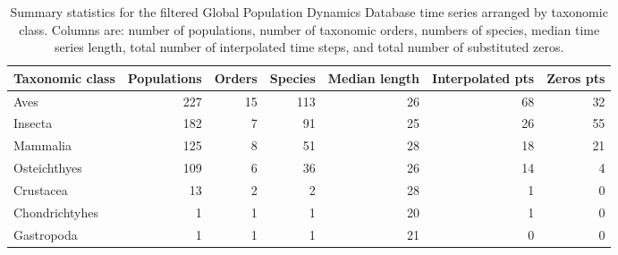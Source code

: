 \begin{table}[ht]
\centering
\caption{Summary statistics for the filtered Global Population Dynamics Database time series arranged by taxonomic class. Columns are: number of populations, number of taxonomic orders, numbers of species, median time series length, total number of interpolated time steps, and total number of substituted zeros.} 
\begin{tabular}{lrrrrrr}
  \toprule
Taxonomic class & Populations & Orders & Species & Median length & Interpolated pts & Zeros pts \\ 
  \midrule
Aves & 227 &  15 & 113 &  26 &  68 &  32 \\ 
  Insecta & 182 &   7 &  91 &  25 &  26 &  55 \\ 
  Mammalia & 125 &   8 &  51 &  28 &  18 &  21 \\ 
  Osteichthyes & 109 &   6 &  36 &  26 &  14 &   4 \\ 
  Crustacea &  13 &   2 &   2 &  28 &   1 &   0 \\ 
  Chondrichtyhes &   1 &   1 &   1 &  20 &   1 &   0 \\ 
  Gastropoda &   1 &   1 &   1 &  21 &   0 &   0 \\ 
   \bottomrule
\end{tabular}
\end{table}

